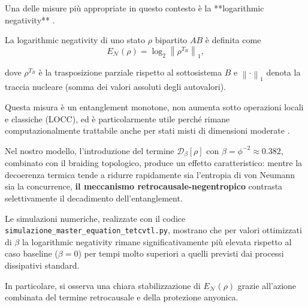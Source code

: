 \documentclass[11pt,a4paper]{article}
\let\oldcite\cite
\renewcommand{\cite}{\protect\oldcite}
\theoremstyle{plain}
\theoremstyle{definition}
\begin{document}
\vspace{0.3cm}

Una delle misure più appropriate in questo contesto è la **logarithmic negativity** \cite{vidal_logneg_2002, plenio_logneg_2005}. 


\clearpage



La logarithmic negativity di uno stato $\rho$ bipartito $AB$ è definita come
\begin{equation}
E_{\mathcal{N}}(\rho) = \log_2 \left\| \rho^{T_B} \right\|_1,
\label{eq:log_neg}
\end{equation}

\vspace{0.3cm}
dove $\rho^{T_B}$ è la trasposizione parziale rispetto al sottosistema $B$ e $\left\| \cdot \right\|_1$ denota la traccia nucleare (somma dei valori assoluti degli autovalori).


\vspace{0.5cm}




Questa misura è un entanglement monotone, non aumenta sotto operazioni locali e classiche (LOCC), ed è particolarmente utile perché rimane computazionalmente trattabile anche per stati misti di dimensioni moderate \cite{plenio_logneg_2005}.

\vspace{0.3cm}

Nel nostro modello, l’introduzione del termine $\mathcal{D}_\beta[\rho]$ con $\beta = \phi^{-2} \approx 0.382$, combinato con il braiding topologico, produce un effetto caratteristico: mentre la decoerenza termica tende a ridurre rapidamente sia l’entropia di von Neumann sia la concurrence, \textbf{il meccanismo retrocausale-negentropico}
contrasta selettivamente il decadimento dell’entanglement. 


\vspace{0.5cm}

Le simulazioni numeriche, realizzate con il codice \texttt{simulazione\_master\_equation\_tetcvtl.py}, mostrano che per valori ottimizzati di $\beta$ la logarithmic negativity rimane significativamente più elevata rispetto al caso baseline ($\beta=0$) per tempi molto superiori a quelli previsti dai processi dissipativi standard. 

\vspace{0.3cm}


In particolare, si osserva una chiara stabilizzazione di $E_{\mathcal{N}}(\rho)$ grazie all’azione combinata del termine retrocausale e della protezione anyonica.
\end{document}
